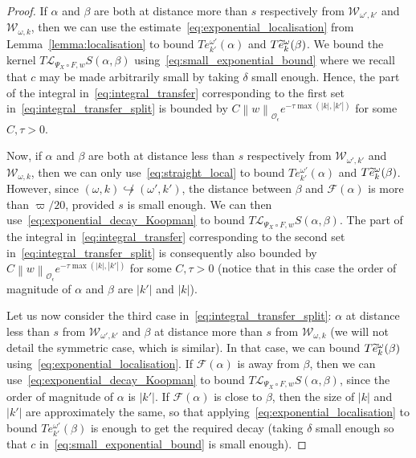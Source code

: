 \documentclass[10pt]{amsart}
\theoremstyle{definition}\newtheorem{defi}[theo]{Definition}\newtheorem{rema}[theo]{Remark}\newtheorem{exam}[theo]{Example}\newtheorem{exem}[theo]{Example}\newtheorem{nota}[theo]{Notation}
\newcommand{\n}[1]{\left\|#1\right\|}
\newcommand{\va}[1]{\left|#1\right|}
\newcommand{\clO}{\mathcal{O}}
\newcommand{\clL}{\mathcal{L}}
\newcommand{\clF}{\mathcal{F}}
\newcommand{\clW}{\mathcal{W}}
\let\oldtilde\tilde
\renewcommand*{\tilde}[1]{\mathchoice{\widetilde{#1}}{\widetilde{#1}}{\oldtilde{#1}}{\oldtilde{#1}}}
\begin{document}
\begin{proof}
If $\alpha$ and $\beta$ are both at distance more than $s$ respectively from $\clW_{\omega',k'}$ and $\clW_{\omega,k}$, then we can use the estimate~\eqref{eq:exponential_localisation} from Lemma~\ref{lemma:localisation} to bound $T e_{k'}^{\omega'} (\alpha)$ and $T \tilde{e}_{k}^{\omega}(\beta)$. We bound the kernel $T \clL_{\Psi_X \circ F,w} S(\alpha,\beta)$ using~\eqref{eq:small_exponential_bound} where we recall that $c$ may be made arbitrarily small by taking $\delta$ small enough. Hence, the part of the integral in~\eqref{eq:integral_transfer} corresponding to the first set in~\eqref{eq:integral_transfer_split} is bounded by $C \n{w}_{\clO_\epsilon} e^{- \tau \max(\va{k},\va{k'})}$ for some $C,\tau > 0$.

Now, if $\alpha$ and $\beta$ are both at distance less than $s$ respectively from $\clW_{\omega',k'}$ and $\clW_{\omega,k}$, then we can only use~\eqref{eq:straight_local} to bound $T e_{k'}^{\omega'} (\alpha)$ and $T \tilde{e}_{k}^{\omega}(\beta)$. However, since $(\omega,k) \not\hookrightarrow (\omega',k')$, the distance between $\beta$ and $\clF(\alpha)$ is more than $ \varpi/20$, provided $s$ is small enough. We can then use~\eqref{eq:exponential_decay_Koopman} to bound $T \clL_{\Psi_X \circ F,w} S(\alpha,\beta)$. The part of the integral in~\eqref{eq:integral_transfer} corresponding to the second set in~\eqref{eq:integral_transfer_split} is consequently also bounded by $C \n{w}_{\clO_\epsilon} e^{- \tau \max(\va{k},\va{k'})}$ for some $C,\tau > 0$ (notice that in this case the order of magnitude of $\alpha$ and $\beta$ are $|k'|$ and $|k|$).

Let us now consider the third case in~\eqref{eq:integral_transfer_split}: $\alpha$ at distance less than $s$ from $\clW_{\omega',k'}$ and $\beta$ at distance more than $s$ from $\clW_{\omega,k}$ (we will not detail the symmetric case, which is similar). In that case, we can bound $T \tilde{e}_{k}^{\omega}(\beta)$ using~\eqref{eq:exponential_localisation}. If $\clF(\alpha)$ is away from $\beta$, then we can use~\eqref{eq:exponential_decay_Koopman} to bound $T \clL_{\Psi_X \circ F,w} S(\alpha,\beta)$, since the order of magnitude of $\alpha$ is $|k'|$. If $\clF(\alpha)$ is close to $\beta$, then the size of $\va{k}$ and $\va{k'}$ are approximately the same, so that applying~\eqref{eq:exponential_localisation} to bound $T e_{k'}^{\omega'}(\beta)$ is enough to get the required decay (taking $\delta$ small enough so that $c$ in~\eqref{eq:small_exponential_bound} is small enough).
\end{proof}
\end{document}
